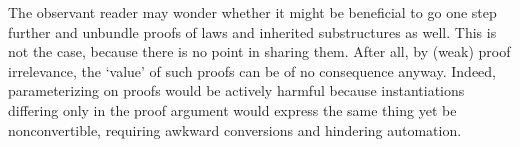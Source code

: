 \documentclass[a4paper,10pt,runningheads]{llncs}
\begin{document}



The observant reader may wonder whether it might be beneficial to go one step further and unbundle proofs of laws and inherited substructures as well. This is not the case, because there is no point in sharing them. After all, by (weak) proof irrelevance, the `value' of such proofs can be of no consequence anyway. Indeed, parameterizing on proofs would be actively harmful because instantiations differing only in the proof argument would express the same thing yet be nonconvertible, requiring awkward conversions and hindering automation.

\end{document}
